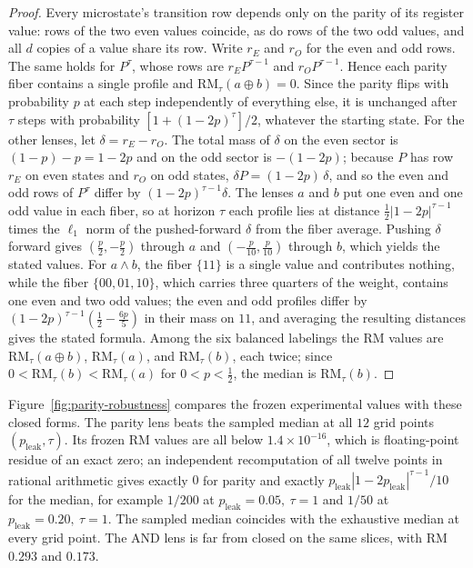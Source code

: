 \begin{proof}
Every microstate's transition row depends only on the parity of its register value: rows of the two even values coincide, as do rows of the two odd values, and all \(d\) copies of a value share its row. Write \(r_E\) and \(r_O\) for the even and odd rows. The same holds for \(P^\tau\), whose rows are \(r_E P^{\tau-1}\) and \(r_O P^{\tau-1}\). Hence each parity fiber contains a single profile and \(\mathrm{RM}_\tau(a\oplus b)=0\). Since the parity flips with probability \(p\) at each step independently of everything else, it is unchanged after \(\tau\) steps with probability \([1+(1-2p)^\tau]/2\), whatever the starting state. For the other lenses, let \(\delta=r_E-r_O\). The total mass of \(\delta\) on the even sector is \((1-p)-p=1-2p\) and on the odd sector is \(-(1-2p)\); because \(P\) has row \(r_E\) on even states and \(r_O\) on odd states, \(\delta P=(1-2p)\,\delta\), and so the even and odd rows of \(P^\tau\) differ by \((1-2p)^{\tau-1}\delta\). The lenses \(a\) and \(b\) put one even and one odd value in each fiber, so at horizon \(\tau\) each profile lies at distance \(\tfrac12|1-2p|^{\tau-1}\) times the \(\ell_1\) norm of the pushed-forward \(\delta\) from the fiber average. Pushing \(\delta\) forward gives \((\tfrac p2,-\tfrac p2)\) through \(a\) and \((-\tfrac p{10},\tfrac p{10})\) through \(b\), which yields the stated values. For \(a\wedge b\), the fiber \(\{11\}\) is a single value and contributes nothing, while the fiber \(\{00,01,10\}\), which carries three quarters of the weight, contains one even and two odd values; the even and odd profiles differ by \((1-2p)^{\tau-1}(\tfrac12-\tfrac{6p}{5})\) in their mass on \(11\), and averaging the resulting distances gives the stated formula. Among the six balanced labelings the RM values are \(\mathrm{RM}_\tau(a\oplus b)\), \(\mathrm{RM}_\tau(a)\), and \(\mathrm{RM}_\tau(b)\), each twice; since \(0<\mathrm{RM}_\tau(b)<\mathrm{RM}_\tau(a)\) for \(0<p<\tfrac12\), the median is \(\mathrm{RM}_\tau(b)\).
\end{proof}

Figure~\ref{fig:parity-robustness} compares the frozen experimental values with these closed forms. The parity lens beats the sampled median at all \(12\) grid points \((p_{\mathrm{leak}},\tau)\). Its frozen RM values are all below \(1.4\times 10^{-16}\), which is floating-point residue of an exact zero; an independent recomputation of all twelve points in rational arithmetic gives exactly \(0\) for parity and exactly \(p_{\mathrm{leak}}|1-2p_{\mathrm{leak}}|^{\tau-1}/10\) for the median, for example \(1/200\) at \(p_{\mathrm{leak}}=0.05,\ \tau=1\) and \(1/50\) at \(p_{\mathrm{leak}}=0.20,\ \tau=1\). The sampled median coincides with the exhaustive median at every grid point. The AND lens is far from closed on the same slices, with RM \(0.293\) and \(0.173\).

